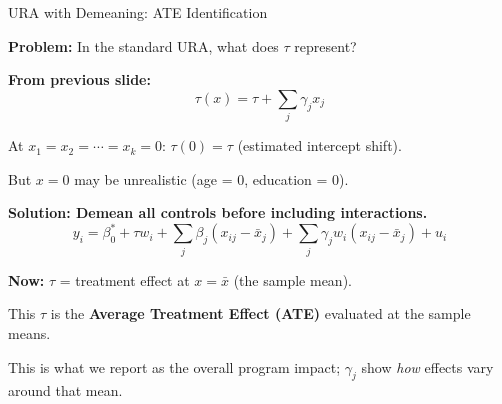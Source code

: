 \documentclass[aspectratio=169, 12pt]{beamer}
\begin{document}
\begin{frame}[shrink=22]{URA with Demeaning: ATE Identification}

  \textbf{Problem:} In the standard URA, what does $\tau$ represent?

  \medskip

  \textbf{From previous slide:}
  \[
    \tau(x) = \tau + \sum_j \gamma_j x_j
  \]

  At $x_1 = x_2 = \cdots = x_k = 0$: $\tau(0) = \tau$ (estimated intercept shift).

  But $x = 0$ may be unrealistic (age = 0, education = 0).

  \medskip

  \textbf{Solution: Demean all controls before including interactions.}
  \[
    y_i = \beta_0^* + \tau w_i + \sum_j \beta_j (x_{ij} - \bar{x}_j) + \sum_j \gamma_j w_i (x_{ij} - \bar{x}_j) + u_i
  \]

  \medskip

  \textbf{Now:} $\tau$ = treatment effect at $x = \bar{x}$ (the sample mean).

  \begin{highlightbox}
    This $\tau$ is the \textbf{Average Treatment Effect (ATE)} evaluated at the sample means.

    This is what we report as the overall program impact; $\gamma_j$ show \textit{how} effects vary around that mean.
  \end{highlightbox}

\end{frame}
\end{document}
